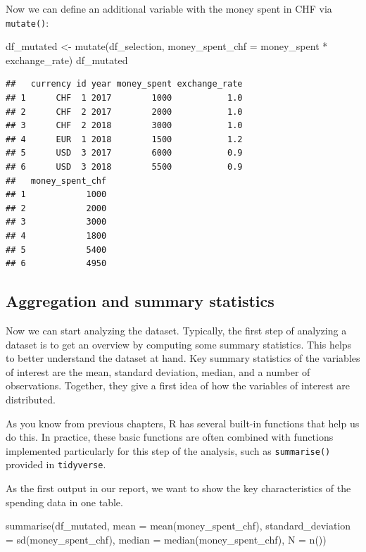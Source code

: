 \documentclass[
  12pt,
]{style/krantz}
\newenvironment{Shaded}{\begin{snugshade}}{\end{snugshade}}
\newcommand{\AttributeTok}[1]{\textcolor[rgb]{0.77,0.63,0.00}{#1}}
\newcommand{\FunctionTok}[1]{\textcolor[rgb]{0.00,0.00,0.00}{#1}}
\newcommand{\NormalTok}[1]{#1}
\newcommand{\OtherTok}[1]{\textcolor[rgb]{0.56,0.35,0.01}{#1}}
\newcommand{\SpecialCharTok}[1]{\textcolor[rgb]{0.00,0.00,0.00}{#1}}
\begin{document}
Now we can define an additional variable with the money spent in CHF via \texttt{mutate()}:

\begin{Shaded}
\begin{Highlighting}[]
\NormalTok{df\_mutated }\OtherTok{\textless{}{-}} \FunctionTok{mutate}\NormalTok{(df\_selection, }\AttributeTok{money\_spent\_chf =}\NormalTok{ money\_spent }\SpecialCharTok{*}\NormalTok{ exchange\_rate)}
\NormalTok{df\_mutated}
\end{Highlighting}
\end{Shaded}

\begin{verbatim}
##   currency id year money_spent exchange_rate
## 1      CHF  1 2017        1000           1.0
## 2      CHF  2 2017        2000           1.0
## 3      CHF  2 2018        3000           1.0
## 4      EUR  1 2018        1500           1.2
## 5      USD  3 2017        6000           0.9
## 6      USD  3 2018        5500           0.9
##   money_spent_chf
## 1            1000
## 2            2000
## 3            3000
## 4            1800
## 5            5400
## 6            4950
\end{verbatim}

\hypertarget{aggregation-and-summary-statistics}{%
\subsection{Aggregation and summary statistics}\label{aggregation-and-summary-statistics}}

Now we can start analyzing the dataset. Typically, the first step of analyzing a dataset is to get an overview by computing some summary statistics. This helps to better understand the dataset at hand. Key summary statistics of the variables of interest are the mean, standard deviation, median, and a number of observations. Together, they give a first idea of how the variables of interest are distributed.

As you know from previous chapters, R has several built-in functions that help us do this. In practice, these basic functions are often combined with functions implemented particularly for this step of the analysis, such as \texttt{summarise()} provided in \texttt{tidyverse}.

As the first output in our report, we want to show the key characteristics of the spending data in one table.

\begin{Shaded}
\begin{Highlighting}[]
\FunctionTok{summarise}\NormalTok{(df\_mutated,}
          \AttributeTok{mean =} \FunctionTok{mean}\NormalTok{(money\_spent\_chf),}
          \AttributeTok{standard\_deviation =} \FunctionTok{sd}\NormalTok{(money\_spent\_chf),}
          \AttributeTok{median =} \FunctionTok{median}\NormalTok{(money\_spent\_chf),}
          \AttributeTok{N =} \FunctionTok{n}\NormalTok{())}
\end{Highlighting}
\end{Shaded}
\end{document}
